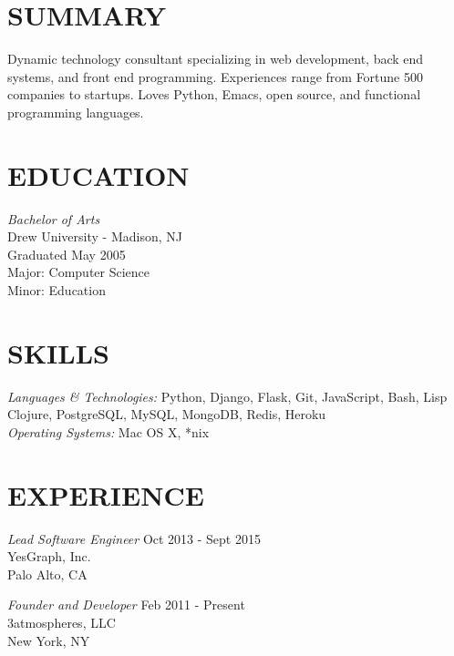 \documentclass[line,margin]{res}
\begin{document}
\address{22 Michael Way, Pennington, NJ 08534}
\address{Email - me@jonathanchu.is}


\begin{resume}

\section{SUMMARY} Dynamic technology consultant specializing in web
                development, back end systems, and front end programming.
                Experiences range from Fortune 500 companies to startups.
                Loves Python, Emacs, open source, and functional programming languages.


\section{EDUCATION} {\sl Bachelor of Arts} \\
                Drew University - Madison, NJ \\
                Graduated May 2005 \\
                Major: Computer Science \\
                Minor: Education


                \section{SKILLS} {\sl Languages \& Technologies:} Python, Django, Flask, Git,
                JavaScript, Bash, Lisp \\
                Clojure, PostgreSQL, MySQL, MongoDB, Redis, Heroku \\
                {\sl Operating Systems:} Mac OS X, *nix


\section{EXPERIENCE} {\sl Lead Software Engineer} \hfill      Oct 2013 - Sept 2015 \\
                YesGraph, Inc. \\
                Palo Alto, CA

                {\sl Founder and Developer} \hfill            Feb 2011 - Present \\
                3atmospheres, LLC \\
                New York, NY


\end{resume}
\end{document}
